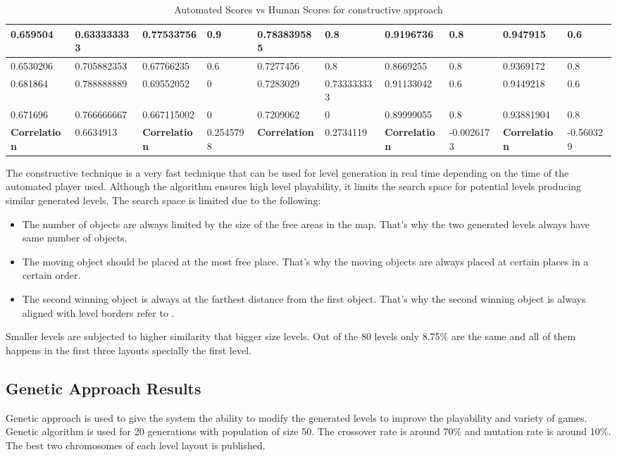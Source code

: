 \begin{landscape}
\begin{table}[!ht]
\begin{tabular}{|p{0.8in}|p{0.8in}|p{0.8in}|p{0.8in}|p{0.8in}|p{0.8in}|p{0.8in}|p{0.8in}|p{0.8in}|p{0.8in}|}
		\hline
		0.659504 & 0.633333333 & 0.77533756 & 0.9 & 0.783839585 & 0.8 & 0.9196736 & 0.8 & 0.947915 & 0.6\\
		\hline
		0.6530206 & 0.705882353 & 0.67766235 & 0.6 & 0.7277456 & 0.8 & 0.8669255 & 0.8 & 0.9369172 & 0.8\\
		\hline
		0.681864 & 0.788888889 & 0.69552052 & 0 & 0.7283029 & 0.733333333 & 0.91133042 & 0.6 & 0.9449218 & 0.6\\
		\hline
		0.671696 & 0.766666667 & 0.667115002 & 0 & 0.7209062 & 0 & 0.89999055 & 0.8 & 0.93881904 & 0.8\\
		\hline
		\textbf{Correlation} & 0.6634913 & \textbf{Correlation} & 0.2545798 & \textbf{Correlation} & 0.2734119 & \textbf{Correlation} & -0.0026173 & \textbf{Correlation} & -0.560329\\
		\hline
	\end{tabular}
	\caption{Automated Scores vs Human Scores for constructive approach}
	\label{Table:constructiveScores}
\end{table}
\end{landscape}

The constructive technique is a very fast technique that can be used for level generation in real time depending on the time of the automated player used. Although the algorithm ensures high level playability, it limits the search space for potential levels producing similar generated levels. The search space is limited due to the following:
\begin{itemize} \itemsep0pt \parskip0pt 
	\item The number of objects are always limited by the size of the free areas in the map. That's why the two generated levels always have same number of objects.
	\item The moving object should be placed at the most free place. That's why the moving objects are always placed at certain places in a certain order.
	\item The second winning object is always at the farthest distance from the first object. That's why the second winning object is always aligned with level borders refer to .
\end{itemize}

Smaller levels are subjected to higher similarity that bigger size levels. Out of the 80 levels only 8.75\% are the same and all of them happens in the first three layouts specially the first level.

\subsection{Genetic Approach Results}
Genetic approach is used to give the system the ability to modify the generated levels to improve the playability and variety of games. Genetic algorithm is used for 20 generations with population of size 50. The crossover rate is around 70\% and mutation rate is around 10\%. The best two chromosomes of each level layout is published.\\\par

